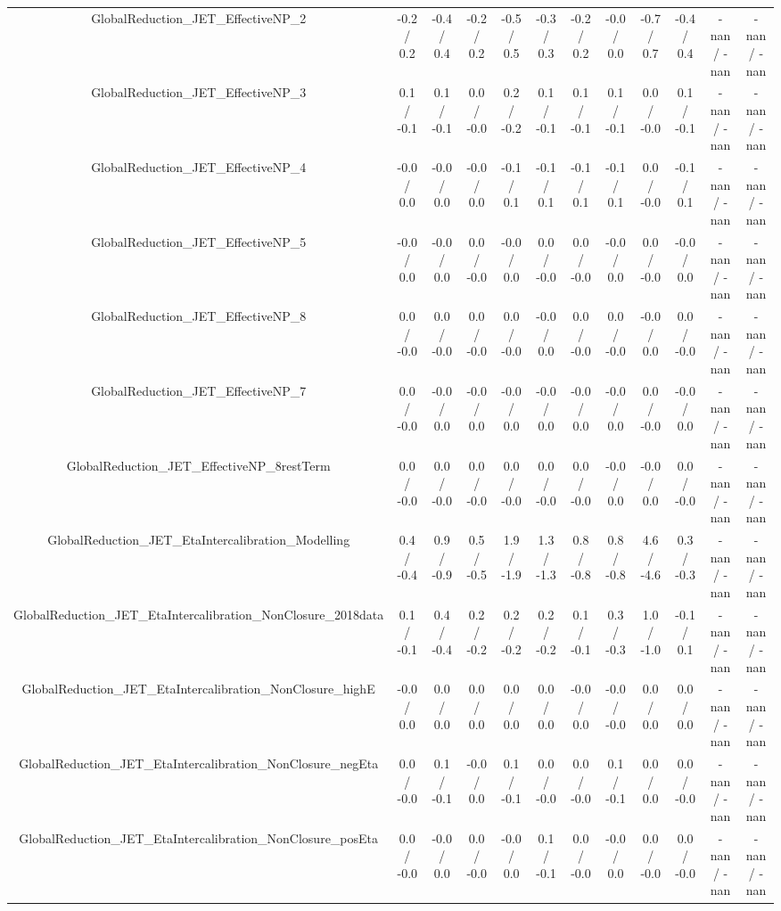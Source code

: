 \begin{table}[htbp]
\begin{center}
\begin{tabular}{|c|c|c|c|c|c|c|c|c|c|c|c|}
  GlobalReduction_JET_EffectiveNP_2 & -0.2 / 0.2 & -0.4 / 0.4 & -0.2 / 0.2 & -0.5 / 0.5 & -0.3 / 0.3 & -0.2 / 0.2 & -0.0 / 0.0 & -0.7 / 0.7 & -0.4 / 0.4 & -nan / -nan & -nan / -nan \\ 
  GlobalReduction_JET_EffectiveNP_3 & 0.1 / -0.1 & 0.1 / -0.1 & 0.0 / -0.0 & 0.2 / -0.2 & 0.1 / -0.1 & 0.1 / -0.1 & 0.1 / -0.1 & 0.0 / -0.0 & 0.1 / -0.1 & -nan / -nan & -nan / -nan \\ 
  GlobalReduction_JET_EffectiveNP_4 & -0.0 / 0.0 & -0.0 / 0.0 & -0.0 / 0.0 & -0.1 / 0.1 & -0.1 / 0.1 & -0.1 / 0.1 & -0.1 / 0.1 & 0.0 / -0.0 & -0.1 / 0.1 & -nan / -nan & -nan / -nan \\ 
  GlobalReduction_JET_EffectiveNP_5 & -0.0 / 0.0 & -0.0 / 0.0 & 0.0 / -0.0 & -0.0 / 0.0 & 0.0 / -0.0 & 0.0 / -0.0 & -0.0 / 0.0 & 0.0 / -0.0 & -0.0 / 0.0 & -nan / -nan & -nan / -nan \\ 
  GlobalReduction_JET_EffectiveNP_8 & 0.0 / -0.0 & 0.0 / -0.0 & 0.0 / -0.0 & 0.0 / -0.0 & -0.0 / 0.0 & 0.0 / -0.0 & 0.0 / -0.0 & -0.0 / 0.0 & 0.0 / -0.0 & -nan / -nan & -nan / -nan \\ 
  GlobalReduction_JET_EffectiveNP_7 & 0.0 / -0.0 & -0.0 / 0.0 & -0.0 / 0.0 & -0.0 / 0.0 & -0.0 / 0.0 & -0.0 / 0.0 & -0.0 / 0.0 & 0.0 / -0.0 & -0.0 / 0.0 & -nan / -nan & -nan / -nan \\ 
  GlobalReduction_JET_EffectiveNP_8restTerm & 0.0 / -0.0 & 0.0 / -0.0 & 0.0 / -0.0 & 0.0 / -0.0 & 0.0 / -0.0 & 0.0 / -0.0 & -0.0 / 0.0 & -0.0 / 0.0 & 0.0 / -0.0 & -nan / -nan & -nan / -nan \\ 
  GlobalReduction_JET_EtaIntercalibration_Modelling & 0.4 / -0.4 & 0.9 / -0.9 & 0.5 / -0.5 & 1.9 / -1.9 & 1.3 / -1.3 & 0.8 / -0.8 & 0.8 / -0.8 & 4.6 / -4.6 & 0.3 / -0.3 & -nan / -nan & -nan / -nan \\ 
  GlobalReduction_JET_EtaIntercalibration_NonClosure_2018data & 0.1 / -0.1 & 0.4 / -0.4 & 0.2 / -0.2 & 0.2 / -0.2 & 0.2 / -0.2 & 0.1 / -0.1 & 0.3 / -0.3 & 1.0 / -1.0 & -0.1 / 0.1 & -nan / -nan & -nan / -nan \\ 
  GlobalReduction_JET_EtaIntercalibration_NonClosure_highE & -0.0 / 0.0 & 0.0 / 0.0 & 0.0 / 0.0 & 0.0 / 0.0 & 0.0 / 0.0 & -0.0 / 0.0 & -0.0 / -0.0 & 0.0 / 0.0 & 0.0 / 0.0 & -nan / -nan & -nan / -nan \\ 
  GlobalReduction_JET_EtaIntercalibration_NonClosure_negEta & 0.0 / -0.0 & 0.1 / -0.1 & -0.0 / 0.0 & 0.1 / -0.1 & 0.0 / -0.0 & 0.0 / -0.0 & 0.1 / -0.1 & 0.0 / 0.0 & 0.0 / -0.0 & -nan / -nan & -nan / -nan \\ 
  GlobalReduction_JET_EtaIntercalibration_NonClosure_posEta & 0.0 / -0.0 & -0.0 / 0.0 & 0.0 / -0.0 & -0.0 / 0.0 & 0.1 / -0.1 & 0.0 / -0.0 & -0.0 / 0.0 & 0.0 / -0.0 & 0.0 / -0.0 & -nan / -nan & -nan / -nan \\ 

\end{tabular}
\end{center}
\end{table}
